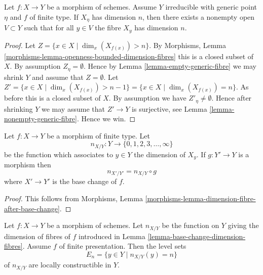 \begin{lemma}
\label{lemma-dimension-in-neighbourhood}
Let $f : X \to Y$ be a morphism of schemes. Assume $Y$ irreducible with
generic point $\eta$ and $f$ of finite type. If $X_\eta$ has dimension $n$,
then there exists a nonempty open $V \subset Y$
such that for all $y \in V$ the fibre $X_y$ has dimension $n$.
\end{lemma}

\begin{proof}
Let $Z = \{x \in X \mid \dim_x(X_{f(x)}) > n \}$. By
Morphisms, Lemma \ref{morphisms-lemma-openness-bounded-dimension-fibres}
this is a closed subset of $X$. By assumption $Z_\eta = \emptyset$.
Hence by
Lemma \ref{lemma-empty-generic-fibre}
we may shrink $Y$ and assume that $Z = \emptyset$. Let
$Z' = \{x \in X \mid \dim_x(X_{f(x)}) > n - 1 \} =
\{x \in X \mid \dim_x(X_{f(x)}) = n\}$. As before this is a closed subset
of $X$. By assumption we have $Z'_\eta \not = \emptyset$. Hence after
shrinking $Y$ we may assume that $Z' \to Y$ is surjective, see
Lemma \ref{lemma-nonempty-generic-fibre}.
Hence we win.
\end{proof}

\begin{lemma}
\label{lemma-base-change-dimension-fibres}
Let $f : X \to Y$ be a morphism of finite type. Let
$$
n_{X/Y} : Y \to \{0, 1, 2, 3, \ldots, \infty\}
$$
be the function which associates to $y \in Y$ the dimension of $X_y$.
If $g : Y' \to Y$ is a morphism then
$$
n_{X'/Y'} = n_{X/Y} \circ g
$$
where $X' \to Y'$ is the base change of $f$.
\end{lemma}

\begin{proof}
This follows from
Morphisms, Lemma \ref{morphisms-lemma-dimension-fibre-after-base-change}.
\end{proof}

\begin{lemma}
\label{lemma-dimension-fibres-constructible}
Let $f : X \to Y$ be a morphism of schemes. Let
$n_{X/Y}$ be the function on $Y$ giving the dimension of fibres of $f$
introduced in
Lemma \ref{lemma-base-change-dimension-fibres}.
Assume $f$ of finite presentation. Then the level sets
$$
E_n = \{y \in Y \mid n_{X/Y}(y) = n\}
$$
of $n_{X/Y}$ are locally constructible in $Y$.
\end{lemma}

